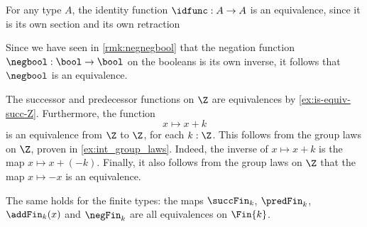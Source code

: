 \begin{eg}\label{thm:id_equiv}
  For any type $A$, the identity function $\idfunc:A\to A$ is an equivalence, since it is its own section and its own retraction
\end{eg}

\begin{eg}\label{ex:neg_equiv}
  Since we have seen in \cref{rmk:negnegbool} that the negation function $\negbool:\bool\to\bool$ on the booleans is its own inverse, it follows that $\negbool$ is an equivalence.
\end{eg}

\begin{eg}\label{eg:is-equiv-succ-Z}
  The successor and predecessor functions on $\Z$ are equivalences by \cref{ex:is-equiv-succ-Z}. Furthermore, the function
  \begin{equation*}
    x\mapsto x+k
  \end{equation*}
  is an equivalence from $\Z$ to $\Z$, for each $k:\Z$. This follows from the group laws on $\Z$, proven in \cref{ex:int_group_laws}. Indeed, the inverse of $x\mapsto x+k$ is the map $x\mapsto x+(-k)$. Finally, it also follows from the group laws on $\Z$ that the map $x\mapsto -x$ is an equivalence.

  The same holds for the finite types: the maps $\succFin_{k}$, $\predFin_{k}$, $\addFin_{k}(x)$ and $\negFin_{k}$ are all equivalences on $\Fin{k}$.
\end{eg}

